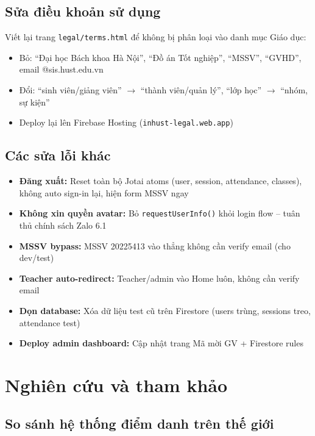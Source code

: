 \documentclass{article}
\begin{document}
\subsection{Sửa điều khoản sử dụng}

Viết lại trang \texttt{legal/terms.html} để không bị phân loại vào danh mục Giáo dục:

\begin{itemize}[leftmargin=1.5em]
  \item Bỏ: ``Đại học Bách khoa Hà Nội'', ``Đồ án Tốt nghiệp'', ``MSSV'', ``GVHD'', email @sis.hust.edu.vn
  \item Đổi: ``sinh viên/giảng viên'' $\rightarrow$ ``thành viên/quản lý'', ``lớp học'' $\rightarrow$ ``nhóm, sự kiện''
  \item Deploy lại lên Firebase Hosting (\texttt{inhust-legal.web.app})
\end{itemize}

\subsection{Các sửa lỗi khác}

\begin{itemize}[leftmargin=1.5em]
  \item \textbf{Đăng xuất:} Reset toàn bộ Jotai atoms (user, session, attendance, classes), không auto sign-in lại, hiện form MSSV ngay
  \item \textbf{Không xin quyền avatar:} Bỏ \texttt{requestUserInfo()} khỏi login flow -- tuân thủ chính sách Zalo 6.1
  \item \textbf{MSSV bypass:} MSSV 20225413 vào thẳng không cần verify email (cho dev/test)
  \item \textbf{Teacher auto-redirect:} Teacher/admin vào Home luôn, không cần verify email
  \item \textbf{Dọn database:} Xóa dữ liệu test cũ trên Firestore (users trùng, sessions treo, attendance test)
  \item \textbf{Deploy admin dashboard:} Cập nhật trang Mã mời GV + Firestore rules
\end{itemize}

\section{Nghiên cứu và tham khảo}

\subsection{So sánh hệ thống điểm danh trên thế giới}
\end{document}
